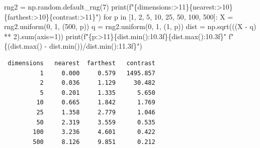 \documentclass[
  letterpaper,
  10pt,
  twoside,
  openright,
  numbers=noenddot,
  chapterprefix=true]{scrbook}
\newenvironment{Shaded}{}{}
\newcommand{\BuiltInTok}[1]{\textcolor[rgb]{0.84,0.23,0.29}{#1}}
\newcommand{\ControlFlowTok}[1]{\textcolor[rgb]{0.84,0.23,0.29}{#1}}
\newcommand{\DecValTok}[1]{\textcolor[rgb]{0.00,0.36,0.77}{#1}}
\newcommand{\KeywordTok}[1]{\textcolor[rgb]{0.84,0.23,0.29}{#1}}
\newcommand{\NormalTok}[1]{\textcolor[rgb]{0.14,0.16,0.18}{#1}}
\newcommand{\OperatorTok}[1]{\textcolor[rgb]{0.14,0.16,0.18}{#1}}
\newcommand{\SpecialCharTok}[1]{\textcolor[rgb]{0.00,0.36,0.77}{#1}}
\newcommand{\SpecialStringTok}[1]{\textcolor[rgb]{0.01,0.18,0.38}{#1}}
\newcommand{\StringTok}[1]{\textcolor[rgb]{0.01,0.18,0.38}{#1}}
\begin{document}
\label{check-curse}
\begin{Shaded}
\begin{Highlighting}[]
\NormalTok{rng2 }\OperatorTok{=}\NormalTok{ np.random.default\_rng(}\DecValTok{7}\NormalTok{)}
\BuiltInTok{print}\NormalTok{(}\SpecialStringTok{f"}\SpecialCharTok{\{}\StringTok{\textquotesingle{}dimensions\textquotesingle{}}\SpecialCharTok{:\textgreater{}11\}\{}\StringTok{\textquotesingle{}nearest\textquotesingle{}}\SpecialCharTok{:\textgreater{}10\}\{}\StringTok{\textquotesingle{}farthest\textquotesingle{}}\SpecialCharTok{:\textgreater{}10\}\{}\StringTok{\textquotesingle{}contrast\textquotesingle{}}\SpecialCharTok{:\textgreater{}11\}}\SpecialStringTok{"}\NormalTok{)}
\ControlFlowTok{for}\NormalTok{ p }\KeywordTok{in}\NormalTok{ [}\DecValTok{1}\NormalTok{, }\DecValTok{2}\NormalTok{, }\DecValTok{5}\NormalTok{, }\DecValTok{10}\NormalTok{, }\DecValTok{25}\NormalTok{, }\DecValTok{50}\NormalTok{, }\DecValTok{100}\NormalTok{, }\DecValTok{500}\NormalTok{]:}
\NormalTok{    X }\OperatorTok{=}\NormalTok{ rng2.uniform(}\DecValTok{0}\NormalTok{, }\DecValTok{1}\NormalTok{, (}\DecValTok{500}\NormalTok{, p))}
\NormalTok{    q }\OperatorTok{=}\NormalTok{ rng2.uniform(}\DecValTok{0}\NormalTok{, }\DecValTok{1}\NormalTok{, (}\DecValTok{1}\NormalTok{, p))}
\NormalTok{    dist }\OperatorTok{=}\NormalTok{ np.sqrt(((X }\OperatorTok{{-}}\NormalTok{ q) }\OperatorTok{**} \DecValTok{2}\NormalTok{).}\BuiltInTok{sum}\NormalTok{(axis}\OperatorTok{=}\DecValTok{1}\NormalTok{))}
    \BuiltInTok{print}\NormalTok{(}\SpecialStringTok{f"}\SpecialCharTok{\{}\NormalTok{p}\SpecialCharTok{:\textgreater{}11\}\{}\NormalTok{dist}\SpecialCharTok{.}\BuiltInTok{min}\NormalTok{()}\SpecialCharTok{:10.3f\}\{}\NormalTok{dist}\SpecialCharTok{.}\BuiltInTok{max}\NormalTok{()}\SpecialCharTok{:10.3f\}}\SpecialStringTok{"}
          \SpecialStringTok{f"}\SpecialCharTok{\{}\NormalTok{(dist.}\BuiltInTok{max}\NormalTok{() }\OperatorTok{{-}}\NormalTok{ dist.}\BuiltInTok{min}\NormalTok{())}\OperatorTok{/}\NormalTok{dist}\SpecialCharTok{.}\BuiltInTok{min}\NormalTok{()}\SpecialCharTok{:11.3f\}}\SpecialStringTok{"}\NormalTok{)}
\end{Highlighting}
\end{Shaded}

\begin{verbatim}
 dimensions   nearest  farthest   contrast
          1     0.000     0.579   1495.857
          2     0.036     1.129     30.482
          5     0.201     1.335      5.650
         10     0.665     1.842      1.769
         25     1.358     2.779      1.046
         50     2.319     3.559      0.535
        100     3.236     4.601      0.422
        500     8.126     9.851      0.212
\end{verbatim}
\end{document}
